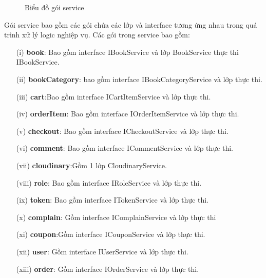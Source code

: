 \documentclass[../DoAn.tex]{subfiles}
\begin{document}
\begin{figure}[H]
    \centering
    \caption{Biểu đồ gói service}
    \label{fig:Fig7}
\end{figure}
Gói service bao gồm các gói chứa các lớp và interface tương ứng nhau trong quá trình xử lý logic nghiệp vụ. Các gói trong service bao gồm:
\begin{enumerate}
    \item [(i)] \textbf{book}: Bao gồm interface IBookService và lớp BookService thực thi IBookService.
    \item [(ii)]\textbf{bookCategory}: bao gồm interface IBookCategoryService và lớp thực thi.
    \item[(iii)] \textbf{cart}:Bao gồm interface ICartItemService và lớp thực thi.
    \item[(iv)] \textbf{orderItem}: Bao gồm interface IOrderItemService và lớp thực thi.
    \item[(v)] \textbf{checkout}: Bao gồm interface ICheckoutService và lớp thực thi.
    \item[(vi)] \textbf{comment}: Bao gồm interface ICommentService và lớp thực thi.
    \item[(vii)] \textbf{cloudinary}:Gồm 1 lớp CloudinaryService.
     \item[(viii)] \textbf{role}: Bao gồm interface IRoleService và lớp thực thi.
    \item[(ix)] \textbf{token}: Bao gồm interface ITokenService và lớp thực thi.
    \item[(x)] \textbf{complain}: Gồm interface IComplainService và lớp thực thi
    \item[(xi)] \textbf{coupon}:Gồm interface ICouponService và lớp thực thi.
    \item[(xii)] \textbf{user}: Gồm interface IUserService và lớp thực thi.
    \item [(xiii)] \textbf{order}: Gồm interface IOrderService và lớp thực thi.   
\end{enumerate}
\end{document}
